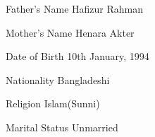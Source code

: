 
\begin{cvpersonals}
  \cvpersonal
    {Father's Name}
    {Hafizur Rahman}

  \cvpersonal
    {Mother's Name}
    {Henara Akter}

  \cvpersonal
    {Date of Birth}
    {10th January, 1994}

  \cvpersonal
    {Nationality}
    {Bangladeshi} 

  \cvpersonal
    {Religion}
    {Islam(Sunni)}

  \cvpersonal
    {Marital Status}
    {Unmarried}
\end{cvpersonals}